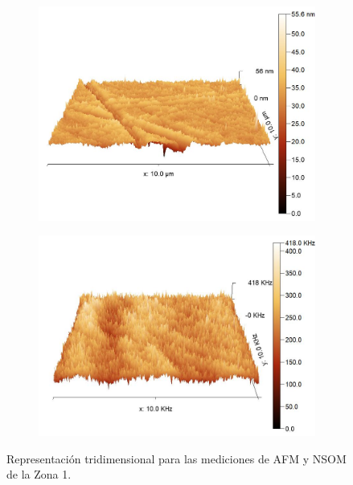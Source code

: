 \begin{figure}[H]
    \centering
    \begin{subfigure}[b]{0.45\textwidth}
        \centering
        \includegraphics[width = 1\textwidth]{figures/chap4/cdte-ag/afm-nsom-results/10um/CdTe_Ag_10um_afm_3d.jpg}
    \end{subfigure}\hfill
    \begin{subfigure}[b]{0.45\textwidth}
        \centering
        \includegraphics[width = 1\textwidth]{figures/chap4/cdte-ag/afm-nsom-results/10um/CdTe_Ag_10um_nsom_3d.jpg}
    \end{subfigure}
\caption{Representación tridimensional para las mediciones de AFM y NSOM de la Zona 1.}
\label{fig:afm-nsom-results-10um-3d}
\end{figure}

